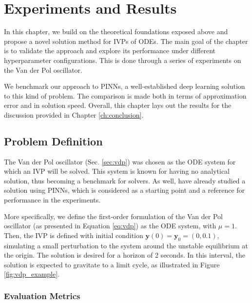 \chapter{Experiments and Results}\label{ch:experiments}

In this chapter, we build on the theoretical foundations exposed above and propose a novel solution method for \glspl{IVP} of \glspl{ODE}.
The main goal of the chapter is to validate the approach and explore its performance under different hyperparameter configurations.
This is done through a series of experiments on the Van der Pol oscillator.

We benchmark our approach to \glspl{PINN}, a well-established deep learning solution to this kind of problem.
The comparison is made both in terms of approximation error and in solution speed.
Overall, this chapter lays out the results for the discussion provided in Chapter \ref{ch:conclusion}.

\section{Problem Definition}

The Van der Pol oscillator (Sec. \ref{sec:vdp}) was chosen as the \gls{ODE} system for which an \gls{IVP} will be solved.
This system is known for having no analytical solution, thus becoming a benchmark for solvers.
As well, \textcite{Antonelo2021} have already studied a solution using \gls{PINN}s, which is considered as a starting point and a reference for performance in the experiments.

More specifically, we define the first-order formulation of the Van der Pol oscillator (as presented in Equation \eqref{eq:vdp}) as the \gls{ODE} system, with $\mu=1$.
Then, the \gls{IVP} is defined with initial condition $\bm{y}(0) = \bm{y}_0 = \left( 0, 0.1 \right) $, simulating a small perturbation to the system around the unstable equilibrium at the origin. The solution is desired for a horizon of 2 seconds. 
In this interval, the solution is expected to gravitate to a limit cycle, as illustrated in Figure \ref{fig:vdp_example}.

\subsection{Evaluation Metrics}

